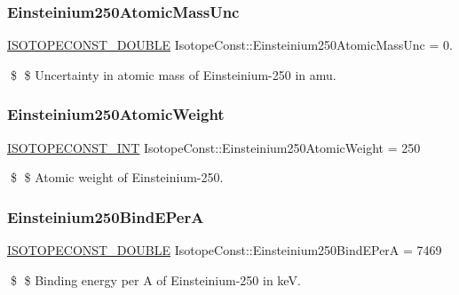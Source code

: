 \subsubsection{\texorpdfstring{Einsteinium250\+Atomic\+Mass\+Unc}{Einsteinium250AtomicMassUnc}}
{\footnotesize\ttfamily \mbox{\hyperlink{group___isotope_const-_macros_ga8f45a7272ce02c0b4c65c44636ed719a}{I\+S\+O\+T\+O\+P\+E\+C\+O\+N\+S\+T\+\_\+\+D\+O\+U\+B\+LE}} Isotope\+Const\+::\+Einsteinium250\+Atomic\+Mass\+Unc = 0.}

\$ \$ Uncertainty in atomic mass of Einsteinium-\/250 in amu. \mbox{\label{group___isotope_const-_einsteinium-_es250_ga4e0391f03f0f9ca79e9bfc2e01f3f97e}} 
\subsubsection{\texorpdfstring{Einsteinium250\+Atomic\+Weight}{Einsteinium250AtomicWeight}}
{\footnotesize\ttfamily \mbox{\hyperlink{group___isotope_const-_macros_ga5f18360b3e99483a35c32d789e62621c}{I\+S\+O\+T\+O\+P\+E\+C\+O\+N\+S\+T\+\_\+\+I\+NT}} Isotope\+Const\+::\+Einsteinium250\+Atomic\+Weight = 250}

\$ \$ Atomic weight of Einsteinium-\/250. \mbox{\label{group___isotope_const-_einsteinium-_es250_ga1ad3f8e9c11b686acce255f55d5c6a15}} 
\subsubsection{\texorpdfstring{Einsteinium250\+Bind\+E\+PerA}{Einsteinium250BindEPerA}}
{\footnotesize\ttfamily \mbox{\hyperlink{group___isotope_const-_macros_ga8f45a7272ce02c0b4c65c44636ed719a}{I\+S\+O\+T\+O\+P\+E\+C\+O\+N\+S\+T\+\_\+\+D\+O\+U\+B\+LE}} Isotope\+Const\+::\+Einsteinium250\+Bind\+E\+PerA = 7469}

\$ \$ Binding energy per A of Einsteinium-\/250 in keV. \mbox{\label{group___isotope_const-_einsteinium-_es250_ga06ad42b67d16ca1c4c7d0660bebafd76}} 
